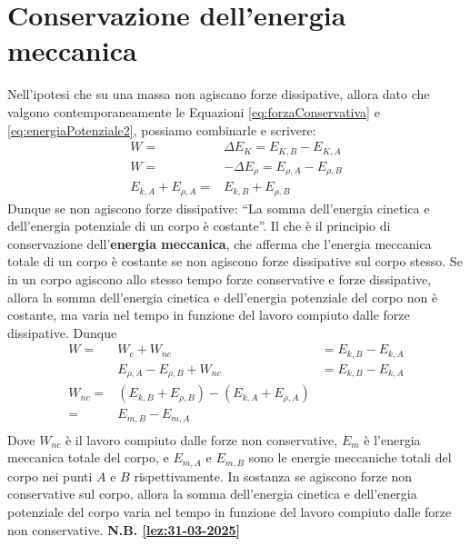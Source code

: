 \section{Conservazione dell'energia meccanica}
    \label{subsec:conservazioneEnergiaMeccanica}
    Nell'ipotesi che su una massa non agiscano forze dissipative, allora dato che valgono contemporaneamente le Equazioni \ref{eq:forzaConservativa} e \ref{eq:energiaPotenziale2}, possiamo combinarle e scrivere:
    \begin{align}
        W =& \Delta E_K = E_{K,B} - E_{K,A} \nonumber\\
        W =& -\Delta E_{\rho} = E_{\rho,A} - E_{\rho,B} \nonumber\\
        E_{k,A} + E_{\rho,A} =& E_{k,B} + E_{\rho,B} 
    \end{align}
    Dunque se non agiscono forze dissipative: ``La somma dell'energia cinetica e dell'energia potenziale di un corpo è costante''. Il che è il principio di conservazione dell'\textbf{energia meccanica}, che afferma che l'energia meccanica totale di un corpo è costante se non agiscono forze dissipative sul corpo stesso. \newline
    Se in un corpo agiscono allo stesso tempo forze conservative e forze dissipative, allora la somma dell'energia cinetica e dell'energia potenziale del corpo non è costante, ma varia nel tempo in funzione del lavoro compiuto dalle forze dissipative. Dunque
    \begin{align*}
        W =& W_{c} + W_{nc} &= E_{k,B} - E_{k,A}\\
        & E_{\rho,A} - E_{\rho,B} + W_{nc} &= E_{k,B} - E_{k,A}\\
        W_{nc} =& (E_{k,B} + E_{\rho,B}) - (E_{k,A} + E_{\rho,A})&\\
        =& E_{m,B} - E_{m,A}\\
    \end{align*}
    Dove $W_{nc}$ è il lavoro compiuto dalle forze non conservative, $E_{m}$ è l'energia meccanica totale del corpo, e $E_{m,A}$ e $E_{m,B}$ sono le energie meccaniche totali del corpo nei punti $A$ e $B$ rispettivamente. In sostanza se agiscono forze non conservative sul corpo, allora la somma dell'energia cinetica e dell'energia potenziale del corpo varia nel tempo in funzione del lavoro compiuto dalle forze non conservative.\newline
    \textbf{N.B. \ref{lez:31-03-2025}}
